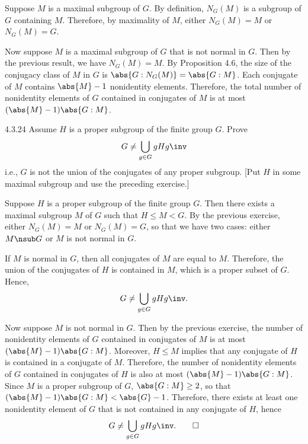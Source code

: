 \begin{sol}
	Suppose $M$ is a maximal subgroup of $G$.
	By definition, $N_G(M)$ is a subgroup of $G$ containing $M$.
	Therefore, by maximality of $M$, either $N_G(M) = M$ or $N_G(M) = G$.

	Now suppose $M$ is a maximal subgroup of $G$ that is not normal in $G$.
	Then by the previous result, we have $N_G(M) = M$.
	By Proposition 4.6, the size of the conjugacy class of $M$ in $G$ is $\abs{G : N_G(M)} = \abs{G : M}$.
	Each conjugate of $M$ contains $\abs{M} - 1$ nonidentity elements.
	Therefore, the total number of nonidentity elements of $G$ contained in conjugates of $M$ is at most $(\abs{M} - 1)\abs{G : M}$.
\end{sol}

\begin{exercise}{4.3.24}
	Assume $H$ is a proper subgroup of the finite group $G$.
	Prove
	\[
		G \neq \bigcup_{g \in G} gHg\inv
	\]
	i.e., $G$ is not the union of the conjugates of any proper subgroup. [Put $H$ in some maximal subgroup and use the preceding exercise.]
\end{exercise}

\begin{sol}
	Suppose $H$ is a proper subgroup of the finite group $G$.
	Then there exists a maximal subgroup $M$ of $G$ such that $H \leq M < G$.
	By the previous exercise, either $N_G(M) = M$ or $N_G(M) = G$, so that we have two cases: either $M \nsub G$ or $M$ is not normal in $G$.

	If $M$ is normal in $G$, then all conjugates of $M$ are equal to $M$.
	Therefore, the union of the conjugates of $H$ is contained in $M$, which is a proper subset of $G$.
	Hence, 
	\[
		G \neq \bigcup_{g \in G} gHg\inv.
	\]
	
	
	Now suppose $M$ is not normal in $G$.
	Then by the previous exercise, the number of nonidentity elements of $G$ contained in conjugates of $M$ is at most $(\abs{M} - 1)\abs{G : M}$.
	Moreover, $H \leq M$ implies that any conjugate of $H$ is contained in a conjugate of $M$.
	Therefore, the number of nonidentity elements of $G$ contained in conjugates of $H$ is also at most $(\abs{M} - 1)\abs{G : M}$.
	Since $M$ is a proper subgroup of $G$, $\abs{G : M} \geq 2$, so that $(\abs{M} - 1)\abs{G : M} < \abs{G} - 1$.
	Therefore, there exists at least one nonidentity element of $G$ that is not contained in any conjugate of $H$, hence
	\[
		G \neq \bigcup_{g \in G} gHg\inv. \qedhere
	\]
\end{sol}

